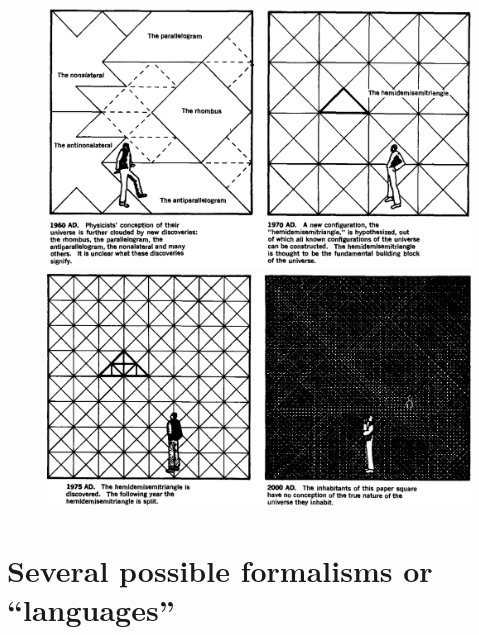 \documentclass[a4paper,12pt,%
onecolumn,oneside,%
british%
]{memoir}
\renewcommand*{\|}[1][]{\nonscript\:#1\vert\nonscript\:\mathopen{}}
\begin{document}
\begin{figure}[p]
  \centering
  \includegraphics[width=1.2\linewidth]{images/chew3.png}
\\[1em]  \includegraphics[width=1.2\linewidth]{images/chew4.png}
  \label{fig:chew2}
\end{figure}

\newpage
\section{Several possible formalisms or \enquote{languages}}
\label{sec:languages}
\end{document}
